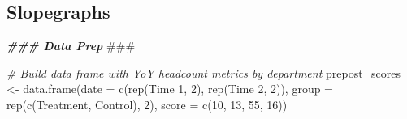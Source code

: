 \documentclass[
]{book}
\newenvironment{Shaded}{\begin{snugshade}}{\end{snugshade}}
\newcommand{\AlertTok}[1]{\textcolor[rgb]{0.94,0.16,0.16}{#1}}
\newcommand{\AttributeTok}[1]{\textcolor[rgb]{0.77,0.63,0.00}{#1}}
\newcommand{\CommentTok}[1]{\textcolor[rgb]{0.56,0.35,0.01}{\textit{#1}}}
\newcommand{\DecValTok}[1]{\textcolor[rgb]{0.00,0.00,0.81}{#1}}
\newcommand{\DocumentationTok}[1]{\textcolor[rgb]{0.56,0.35,0.01}{\textbf{\textit{#1}}}}
\newcommand{\FunctionTok}[1]{\textcolor[rgb]{0.00,0.00,0.00}{#1}}
\newcommand{\NormalTok}[1]{#1}
\newcommand{\OtherTok}[1]{\textcolor[rgb]{0.56,0.35,0.01}{#1}}
\newcommand{\StringTok}[1]{\textcolor[rgb]{0.31,0.60,0.02}{#1}}
\begin{document}
\hypertarget{slopegraphs-1}{%
\subsection{Slopegraphs}\label{slopegraphs-1}}

\begin{Shaded}
\begin{Highlighting}[]
\DocumentationTok{\#\#\# Data Prep }\AlertTok{\#\#\#}

\CommentTok{\# Build data frame with YoY headcount metrics by department}
\NormalTok{prepost\_scores }\OtherTok{\textless{}{-}} \FunctionTok{data.frame}\NormalTok{(}\AttributeTok{date =} \FunctionTok{c}\NormalTok{(}\FunctionTok{rep}\NormalTok{(}\StringTok{\textquotesingle{}Time 1\textquotesingle{}}\NormalTok{, }\DecValTok{2}\NormalTok{), }\FunctionTok{rep}\NormalTok{(}\StringTok{\textquotesingle{}Time 2\textquotesingle{}}\NormalTok{, }\DecValTok{2}\NormalTok{)),}
                             \AttributeTok{group =} \FunctionTok{rep}\NormalTok{(}\FunctionTok{c}\NormalTok{(}\StringTok{\textquotesingle{}Treatment\textquotesingle{}}\NormalTok{, }\StringTok{\textquotesingle{}Control\textquotesingle{}}\NormalTok{), }\DecValTok{2}\NormalTok{),}
                             \AttributeTok{score =} \FunctionTok{c}\NormalTok{(}\DecValTok{10}\NormalTok{, }\DecValTok{13}\NormalTok{, }\DecValTok{55}\NormalTok{, }\DecValTok{16}\NormalTok{))}
\end{Highlighting}
\end{Shaded}
\end{document}
